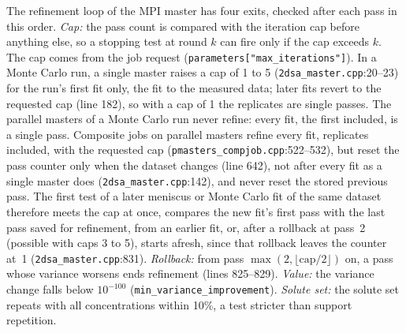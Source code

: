 \documentclass[pdflatex,sn-mathphys-num]{sn-jnl}
\begin{document}
The refinement loop of the MPI master has four exits, checked after
each pass in this order. \emph{Cap:} the pass count is compared with
the iteration cap before anything else, so a stopping test at round
$k$ can fire only if the cap exceeds $k$. The cap comes from the job
request (\texttt{parameters["max\_iterations"]}). In a Monte Carlo
run, a single master raises a cap of 1 to 5
(\texttt{2dsa\_master.cpp}:20--23) for the run's first fit only, the
fit to the measured data; later fits revert to the requested cap
(line 182), so with a cap of 1 the replicates are single passes. The
parallel masters of a Monte Carlo run never refine: every fit, the
first included, is a single pass. Composite jobs on parallel masters
refine every fit, replicates included, with the requested cap
(\texttt{pmasters\_compjob.cpp}:522--532), but reset the pass counter
only when the dataset changes (line 642), not after every fit as a
single master does (\texttt{2dsa\_master.cpp}:142), and never reset the
stored previous pass. The first test of a later meniscus or Monte Carlo fit
of the same dataset therefore meets the cap at once, compares the new
fit's first pass with the last pass saved for refinement, from an
earlier fit, or, after a rollback
at pass~2 (possible with caps 3 to 5), starts afresh, since that
rollback leaves the counter at~1 (\texttt{2dsa\_master.cpp}:831).
\emph{Rollback:} from pass $\max(2,\lfloor\mathrm{cap}/2\rfloor)$ on, a
pass whose variance worsens ends refinement (lines 825--829).
\emph{Value:} the variance change falls below $10^{-100}$
(\texttt{min\_variance\_improvement}). \emph{Solute set:} the solute
set repeats with all concentrations within 10\%, a test stricter than
support repetition.
\end{document}
